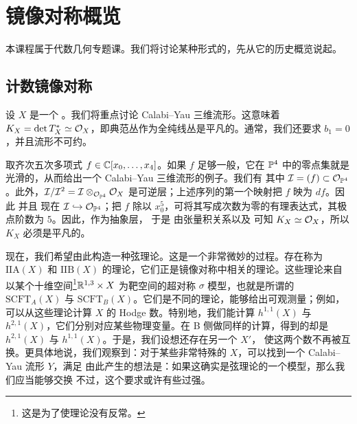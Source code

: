 \chapter*{镜像对称概览}
\setcounter{chapter}{0}\setcounter{section}{0}\setcounter{equation}{0}
本课程属于代数几何专题课。我们将讨论某种形式的，先从它的历史概览说起。
\section{计数镜像对称}
设 $X$ 是一个 。我们将重点讨论 Calabi–Yau 三维流形。这意味着
$K_X=\det T_X^*\simeq\mathcal O_X$，即典范丛作为全纯线丛是平凡的。通常，我们还要求 $b_1=0$，并且流形不可约。
\begin{example}[（$\PP^4$ 中的五次超曲面）]\label{ex:0.1}
取齐次五次多项式 $f\in\mathbb C[x_0,\ldots,x_4]$。如果 $f$ 足够一般，它在 $\PP^4$ 中的零点集就是光滑的，从而给出一个 Calabi–Yau 三维流形的例子。我们有
其中 $\mathcal I=(f)\subset\mathcal O_{\mathbb P^4}$。此外，$\mathcal I/\mathcal I^2=\mathcal I\otimes_{\mathcal O_{\mathbb P^4}}\mathcal O_X$ 是可逆层；上述序列的第一个映射把 $f$ 映为 $df$。因此
并且
现在 $\mathcal I\hookrightarrow\mathcal O_{\mathbb P^4}$；把 $f$ 除以 $x_0^5$，可将其写成次数为零的有理表达式，其极点阶数为 $5$。因此，作为抽象层，
于是
由张量积关系以及
可知 $K_X\simeq\mathcal O_X$，所以 $K_X$ 必须是平凡的。
\end{example}
现在，我们希望由此构造一种弦理论。这是一个非常微妙的过程。存在称为 $\mathrm{IIA}(X)$ 和 $\mathrm{IIB}(X)$ 的理论，它们正是镜像对称中相关的理论。这些理论来自以某个十维空间\footnote{这是为了使理论没有反常。}$\mathbb R^{1,3}\times X$ 为靶空间的超对称 $\sigma$ 模型，也就是所谓的 $\mathrm{SCFT}_A(X)$ 与 $\mathrm{SCFT}_B(X)$。它们是不同的理论，能够给出可观测量；例如，可以从这些理论计算 $X$ 的 Hodge 数。特别地，我们能计算 $h^{1,1}(X)$ 与 $h^{2,1}(X)$，它们分别对应某些物理变量。在 B 侧做同样的计算，得到的却是 $h^{2,1}(X)$ 与 $h^{1,1}(X)$。于是，我们设想还存在另一个 $X'$，
使这两个数不再被互换。更具体地说，我们观察到：对于某些非常特殊的 $X$，可以找到一个 Calabi–Yau 流形 $Y$，满足
由此产生的想法是：如果这确实是弦理论的一个模型，那么我们应当能够交换
不过，这个要求或许有些过强。
